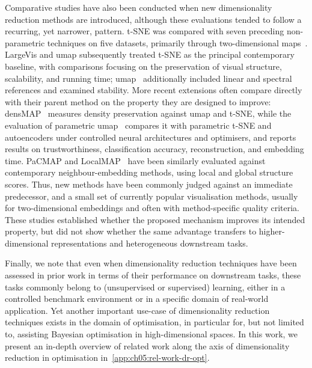 Comparative studies have also been conducted when new dimensionality reduction methods are introduced, although these evaluations tended to follow a recurring, yet narrower, pattern. t-SNE was compared with seven preceding non-parametric techniques on five datasets, primarily through two-dimensional maps~\citep{VanHin08}. LargeVis and \gls{umap} subsequently treated t-SNE as the principal contemporary baseline, with comparisons focusing on the preservation of visual structure, scalability, and running time; \gls{umap}~\citep{McIEtAl18} additionally included linear and spectral references and examined stability. More recent extensions often compare directly with their parent method on the property they are designed to improve: densMAP~\citep{NarEtAl21} measures density preservation against \gls{umap} and t-SNE, while the evaluation of parametric \gls{umap}~\citep{SaiEtAl21} compares it with parametric t-SNE and autoencoders under controlled neural architectures and optimisers, and reports results on trustworthiness, classification accuracy, reconstruction, and embedding time.
PaCMAP and LocalMAP~\citep{WanEtAl21,WanEtAl25} have been similarly evaluated against contemporary neighbour-embedding methods, using local and global structure scores. Thus, new methods have been commonly judged against an immediate predecessor, and a small set of currently popular visualisation methods, usually for two-dimensional embeddings and often with method-specific quality criteria. These studies established whether the proposed mechanism improves its intended property, but did not show whether the same advantage transfers to higher-dimensional representations and heterogeneous downstream tasks.

Finally, we note that even when dimensionality reduction techniques have been assessed in prior work in terms of their performance on downstream tasks, these tasks commonly belong to (unsupervised or supervised) learning, either in a controlled benchmark environment or in a specific domain of real-world application. Yet another important use-case of dimensionality reduction techniques exists in the domain of optimisation, in particular for, but not limited to, assisting Bayesian optimisation in high-dimensional spaces. In this work, we present an in-depth overview of related work along the axis of dimensionality reduction in optimisation in~\cref{app:ch05:rel-work-dr-opt}.

